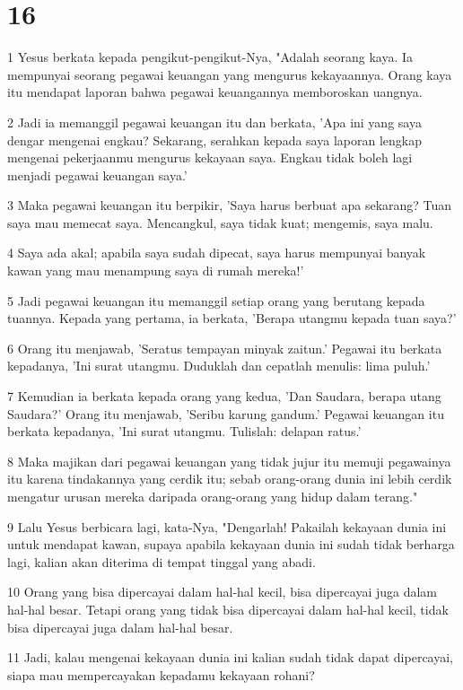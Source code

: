 \chapter{16}

\par 1 Yesus berkata kepada pengikut-pengikut-Nya, "Adalah seorang kaya. Ia mempunyai seorang pegawai keuangan yang mengurus kekayaannya. Orang kaya itu mendapat laporan bahwa pegawai keuangannya memboroskan uangnya.
\par 2 Jadi ia memanggil pegawai keuangan itu dan berkata, 'Apa ini yang saya dengar mengenai engkau? Sekarang, serahkan kepada saya laporan lengkap mengenai pekerjaanmu mengurus kekayaan saya. Engkau tidak boleh lagi menjadi pegawai keuangan saya.'
\par 3 Maka pegawai keuangan itu berpikir, 'Saya harus berbuat apa sekarang? Tuan saya mau memecat saya. Mencangkul, saya tidak kuat; mengemis, saya malu.
\par 4 Saya ada akal; apabila saya sudah dipecat, saya harus mempunyai banyak kawan yang mau menampung saya di rumah mereka!'
\par 5 Jadi pegawai keuangan itu memanggil setiap orang yang berutang kepada tuannya. Kepada yang pertama, ia berkata, 'Berapa utangmu kepada tuan saya?'
\par 6 Orang itu menjawab, 'Seratus tempayan minyak zaitun.' Pegawai itu berkata kepadanya, 'Ini surat utangmu. Duduklah dan cepatlah menulis: lima puluh.'
\par 7 Kemudian ia berkata kepada orang yang kedua, 'Dan Saudara, berapa utang Saudara?' Orang itu menjawab, 'Seribu karung gandum.' Pegawai keuangan itu berkata kepadanya, 'Ini surat utangmu. Tulislah: delapan ratus.'
\par 8 Maka majikan dari pegawai keuangan yang tidak jujur itu memuji pegawainya itu karena tindakannya yang cerdik itu; sebab orang-orang dunia ini lebih cerdik mengatur urusan mereka daripada orang-orang yang hidup dalam terang."
\par 9 Lalu Yesus berbicara lagi, kata-Nya, "Dengarlah! Pakailah kekayaan dunia ini untuk mendapat kawan, supaya apabila kekayaan dunia ini sudah tidak berharga lagi, kalian akan diterima di tempat tinggal yang abadi.
\par 10 Orang yang bisa dipercayai dalam hal-hal kecil, bisa dipercayai juga dalam hal-hal besar. Tetapi orang yang tidak bisa dipercayai dalam hal-hal kecil, tidak bisa dipercayai juga dalam hal-hal besar.
\par 11 Jadi, kalau mengenai kekayaan dunia ini kalian sudah tidak dapat dipercayai, siapa mau mempercayakan kepadamu kekayaan rohani?
